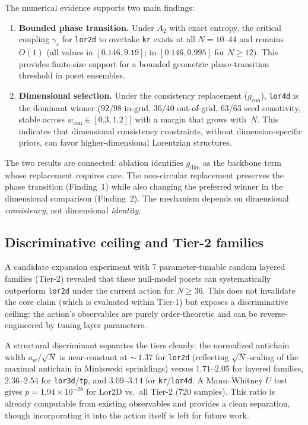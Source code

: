 \documentclass[12pt,a4paper]{article}
\begin{document}
The numerical evidence supports two main findings:

\begin{enumerate}[nosep]
\item \textbf{Bounded phase transition.} Under $A_2$ with exact entropy, the
critical coupling $\gamma_c$ for \texttt{lor2d} to overtake \texttt{kr} exists
at all $N = 10$--$44$ and remains $O(1)$ (all values in $[0.146, 9.19]$; in
$[0.146, 0.995]$ for $N \geq 12$). This provides finite-size support for a
bounded geometric phase-transition threshold in poset ensembles.

\item \textbf{Dimensional selection.} Under the consistency replacement
($g_{\text{con}}$), \texttt{lor4d} is the dominant winner ($92/98$ in-grid,
$36/40$ out-of-grid, $63/63$ seed sensitivity, stable across
$w_{\text{con}} \in [0.3, 1.2]$) with a margin that grows with~$N$.
This indicates that dimensional consistency constraints, without
dimension-specific priors, can favor higher-dimensional Lorentzian
structures.
\end{enumerate}

The two results are connected: ablation identifies $g_{\text{dim}}$ as the
backbone term whose replacement requires care. The non-circular replacement
preserves the phase transition (Finding~1) while also changing the preferred
winner in the dimensional comparison (Finding~2). The mechanism depends on
dimensional \emph{consistency}, not dimensional \emph{identity}.

\subsection{Discriminative ceiling and Tier-2 families}
\label{sec:ceiling}

A candidate expansion experiment with 7 parameter-tunable random layered
families (Tier-2) revealed that these null-model posets can systematically
outperform \texttt{lor2d} under the current action for $N \geq 36$. This does
not invalidate the core claim (which is evaluated within Tier-1) but exposes a
discriminative ceiling: the action's observables are purely order-theoretic and
can be reverse-engineered by tuning layer parameters.

A structural discriminant separates the tiers cleanly: the normalized antichain
width $a_w / \sqrt{N}$ is near-constant at ${\sim}\,1.37$ for \texttt{lor2d}
(reflecting $\sqrt{N}$-scaling of the maximal antichain in Minkowski
sprinklings) versus $1.71\text{--}2.05$ for layered families,
$2.36\text{--}2.54$ for \texttt{lor3d}/\texttt{tp}, and
$3.09\text{--}3.14$ for \texttt{kr}/\texttt{lor4d}.
A Mann--Whitney $U$ test gives $p = 1.94 \times 10^{-28}$ for Lor2D vs.\ all
Tier-2 (720 samples). This ratio is already computable from existing observables
and provides a clean separation, though incorporating it into the action itself
is left for future work.
\end{document}
